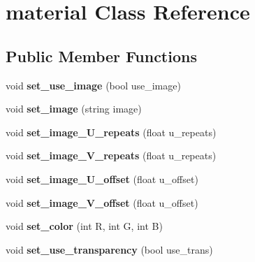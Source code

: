 \hypertarget{classmaterial}{}\section{material Class Reference}
\label{classmaterial}
\subsection*{Public Member Functions}
\begin{DoxyCompactItemize}
\item 
\mbox{\label{classmaterial_a2e0c23b3aa942192e63ecfcef6d6cc3a}} 
void {\bfseries set\+\_\+use\+\_\+image} (bool use\+\_\+image)
\item 
\mbox{\label{classmaterial_a19ad600f4e34c7c8a54c2ae4ad2686ff}} 
void {\bfseries set\+\_\+image} (string image)
\item 
\mbox{\label{classmaterial_aeda1f81477e9014cc249aa1704e61e76}} 
void {\bfseries set\+\_\+image\+\_\+\+U\+\_\+repeats} (float u\+\_\+repeats)
\item 
\mbox{\label{classmaterial_a6e15ddcbb959d94ad018c2974ac7c67d}} 
void {\bfseries set\+\_\+image\+\_\+\+V\+\_\+repeats} (float u\+\_\+repeats)
\item 
\mbox{\label{classmaterial_a0cb4282457e38af015b338900ee03e2c}} 
void {\bfseries set\+\_\+image\+\_\+\+U\+\_\+offset} (float u\+\_\+offset)
\item 
\mbox{\label{classmaterial_aae382b5ac81ab34e173f3cec36748cf8}} 
void {\bfseries set\+\_\+image\+\_\+\+V\+\_\+offset} (float u\+\_\+offset)
\item 
\mbox{\label{classmaterial_a318adce5597355d2c527c18b6f84a2e5}} 
void {\bfseries set\+\_\+color} (int R, int G, int B)
\item 
\mbox{\label{classmaterial_a0f5c19149139579cb56fadd9f9736d4b}} 
void {\bfseries set\+\_\+use\+\_\+transparency} (bool use\+\_\+trans)
\item 
\mbox{\label{classmaterial_a0dd22e29b2d0614f0a71df555d7c58a4}} 

\end{DoxyCompactItemize}
